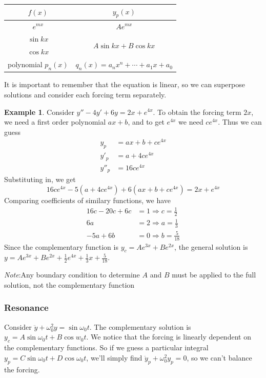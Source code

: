 \documentclass[a4paper]{article}
\theoremstyle{definition}
\newtheorem*{eg}{Example}
\newcommand{\note}{\noindent \emph{Note}:\;}
\begin{document}
\vspace{4pt}
\noindent
\begin{tabular}{cc}
  \toprule
  $f(x)$ & $y_p(x)$\\
  \midrule
  $e^{mx}$ & $Ae^{mx}$\\
  $\sin kx$ & \multirow{2}{*}{$A\sin kx + B\cos kx$}\\
  $\cos kx$ & \\
  polynomial $p_n(x)$ & $q_n(x) = a_nx^n + \cdots + a_1x + a_0$\\
  \bottomrule
\end{tabular}
\vspace{4pt}

It is important to remember that the equation is linear, so we can superpose solutions and consider each forcing term separately.

\begin{eg}
  Consider $y'' - 4y' + 6y = 2x + e^{4x}$. To obtain the forcing term $2x$, we need a first order polynomial $ax + b$, and to get $e^{4x}$ we need $ce^{4x}$. Thus we can guess
  \begin{align*}
    y_p &= ax + b + ce^{4x}\\
    y'_p &= a + 4ce^{4x}\\
    y''_p &= 16ce^{4x}
  \end{align*}
  Substituting in, we get
  \[
  16ce^{4x} - 5(a + 4ce^{4x}) + 6(ax + b + ce^{4x}) = 2x + e^{4x}
  \]
  Comparing coefficients of similary functions, we have
  \begin{align*}
    16c - 20c + 6c &= 1\Rightarrow c = \frac{1}{2}\\
    6a &= 2 \Rightarrow a = \frac{1}{3}\\
    -5a + 6b &= 0 \Rightarrow b = \frac{5}{18}
  \end{align*}
  Since the complementary function is $y_c = Ae^{3x} + Be^{2x}$, the general solution is $y = Ae^{3x} + Be^{2x} + \frac{1}{2}e^{4x} + \frac{1}{3}x + \frac{5}{18}$.

\note Any boundary condition to determine $A$ and $B$ must be applied to the full solution, not the complementary function
\end{eg}
\subsubsection{Resonance}
Consider $\ddot y + \omega_0^2 y = \sin \omega_0 t$. The complementary solution is $y_c = A\sin \omega_0 t + B\cos w_0 t$. We notice that the forcing is linearly dependent on the complementary functions. So if we guess a particular integral $y_p = C\sin \omega_0 t + D\cos \omega_0 t$, we'll simply find $\ddot y_p + \omega_0 ^2 y_p = 0$, so we can't balance the forcing.
\end{document}
